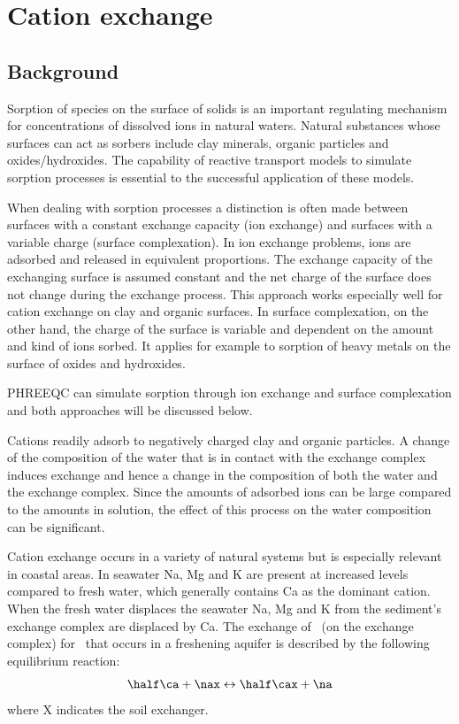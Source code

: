 \normalsize\large\newpage
\chapter{Cation exchange}
\def\shorttitle{Ion exchange} %
\section{Background}

Sorption of species on the surface of solids is an important regulating mechanism for concentrations of dissolved ions in natural waters. Natural substances whose surfaces can act as sorbers include clay minerals, organic particles and oxides/hydroxides. The capability of reactive transport models to simulate sorption processes is essential to the successful application of these models.

When dealing with sorption processes a distinction is often made between surfaces with a constant exchange capacity (ion exchange) and surfaces with a variable charge (surface complexation). In ion exchange problems, ions are adsorbed and released in equivalent proportions. The exchange capacity of the exchanging surface is assumed constant and the net charge of the surface does not change during the exchange process. This approach works especially well for cation exchange on clay and organic surfaces. In surface complexation, on the other hand, the charge of the surface is variable and dependent on the amount and kind of ions sorbed. It applies for example to sorption of heavy metals on the surface of oxides and hydroxides. 

PHREEQC can simulate sorption through ion exchange and surface complexation and both approaches will be discussed below.

Cations readily adsorb to negatively charged clay and organic particles. A change of the composition of the water that is in contact with the exchange complex induces exchange and hence a change in the composition of both the water and the exchange complex. Since the amounts of adsorbed ions can be large compared to the amounts in solution, the effect of this process on the water composition can be significant.

Cation exchange occurs in a variety of natural systems but is especially relevant in coastal areas. In seawater Na, Mg and K are present at increased levels compared to fresh water, which generally contains Ca as the dominant cation. When the fresh water displaces the seawater Na, Mg and K from the sediment's exchange complex are displaced by Ca. The exchange of \na\ (on the exchange complex) for \ca\ that occurs in a freshening aquifer is described by the following equilibrium reaction:
\begin{equation}
\half \ca + \nax \leftrightarrow \half \cax + \na
\end{equation}
where X indicates the soil exchanger.

